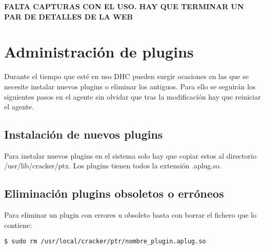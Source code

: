 \textbf{FALTA CAPTURAS CON EL USO. HAY QUE TERMINAR UN PAR DE DETALLES DE LA WEB}

\section{Administración de plugins}

Durante el tiempo que esté en uso DHC pueden surgir ocasiones en las que se necesite instalar nuevos plugins o eliminar los antiguos.  Para ello se seguirán los siguientes pasos en el agente sin olvidar que tras la modificación hay que reiniciar el agente.

\subsection{Instalación de nuevos plugins}

Para instalar nuevos plugins en el sistema solo hay que copiar estos al directorio /usr/lib/cracker/ptx. Los plugins tienen todos la extensión .aplug.so.


\subsection{Eliminación plugins obsoletos o erróneos}

Para eliminar un plugin con errores u obsoleto basta con borrar el fichero que lo contiene:

\begin{verbatim}
$ sudo rm /usr/local/cracker/ptr/nombre_plugin.aplug.so	
\end{verbatim}

